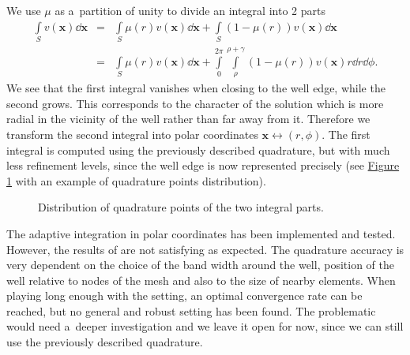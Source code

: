 \documentclass[dvipsnames,FM,Dis]{tulthesis}
\newcommand{\fig}[1]{\hyperref[#1]{Figure \ref{#1}}}
\newcommand{\figpath}{figures/}
\begin{document}
We use $\mu$ as a~partition of unity to divide an integral into 2 parts
\begin{eqnarray} 
      \int\limits_S v(\mathbf{x}) \dd \mathbf{x} &=& \int\limits_S \mu(r) v(\mathbf{x}) \dd \mathbf{x} + \int\limits_S (1-\mu(r)) v(\mathbf{x}) \dd \mathbf{x} \nonumber\\
      &=& \int\limits_S \mu(r) v(\mathbf{x}) \dd \mathbf{x} + \int\limits_0^{2\pi} \int\limits_\rho^{\rho+\gamma} (1-\mu(r)) v(\mathbf{x}) r \dd r \dd \phi.
\end{eqnarray}
We see that the first integral vanishes when closing to the well edge, while the second grows. This corresponds
to the character of the solution which is more radial in the vicinity of the well rather than far away from it.
Therefore we transform the second integral into polar coordinates $\mathbf{x} \longleftrightarrow (r,\phi)$. 
The first integral is computed using the previously described quadrature, but with much less refinement
levels, since the well edge is now represented precisely (see \fig{fig:polar_quad_points} with
an example of quadrature points distribution).
%
\begin{figure}[!htb]
  \centering    
  \hspace{0pt}
  \caption[Polar quadrature points]
  {Distribution of quadrature points of the two integral parts.
  }
  \label{fig:polar_quad_points}
\end{figure} 

The adaptive integration in polar coordinates has been implemented and tested.
However, the results of are not satisfying as expected. The quadrature accuracy is very dependent on the choice of
the band width around the well, position of the well relative to nodes of the mesh and also to the size of nearby elements.
When playing long enough with the setting, an optimal convergence rate can be reached, but no general and robust 
setting has been found. The problematic would need a~deeper investigation and we leave it open for now, since
we can still use the previously described quadrature.
\end{document}
